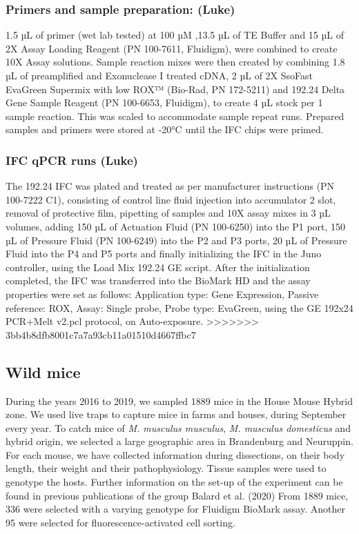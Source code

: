 \documentclass[
]{article}
\begin{document}
\hypertarget{primers-and-sample-preparation-luke}{%
\subsubsection{Primers and sample preparation:
(Luke)}\label{primers-and-sample-preparation-luke}}

1.5 µL of primer (wet lab tested) at 100 µM ,13.5 µL of TE Buffer and 15
µL of 2X Assay Loading Reagent (PN 100-7611, Fluidigm), were combined to
create 10X Assay solutions. Sample reaction mixes were then created by
combining 1.8 µL of preamplified and Exonuclease I treated cDNA, 2 µL of
2X SsoFast EvaGreen Supermix with low ROX™ (Bio-Rad, PN 172-5211) and
192.24 Delta Gene Sample Reagent (PN 100-6653, Fluidigm), to create 4 µL
stock per 1 sample reaction. This was scaled to accommodate sample
repeat runs. Prepared samples and primers were stored at -20°C until the
IFC chips were primed.

\hypertarget{ifc-qpcr-runs-luke}{%
\subsubsection{IFC qPCR runs (Luke)}\label{ifc-qpcr-runs-luke}}

The 192.24 IFC was plated and treated as per manufacturer instructions
(PN 100-7222 C1), consisting of control line fluid injection into
accumulator 2 slot, removal of protective film, pipetting of samples and
10X assay mixes in 3 µL volumes, adding 150 µL of Actuation Fluid (PN
100-6250) into the P1 port, 150 µL of Pressure Fluid (PN 100-6249) into
the P2 and P3 ports, 20 µL of Pressure Fluid into the P4 and P5 ports
and finally initializing the IFC in the Juno controller, using the Load
Mix 192.24 GE script. After the initialization completed, the IFC was
transferred into the BioMark HD and the assay properties were set as
follows: Application type: Gene Expression, Passive reference: ROX,
Assay: Single probe, Probe type: EvaGreen, using the GE 192x24 PCR+Melt
v2.pcl protocol, on Auto-exposure.
>>>>>>> 3bb4b8dfb8001c7a7a93cb11a01510d4667ffbc7

\hypertarget{wild-mice}{%
\subsection{Wild mice}\label{wild-mice}}

During the years 2016 to 2019, we sampled 1889 mice in the House Mouse
Hybrid zone. We used live traps to capture mice in farms and houses,
during September every year. To catch mice of \emph{M. musculus
musculus}, \emph{M. musculus domesticus} and hybrid origin, we selected
a large geographic area in Brandenburg and Neuruppin. For each mouse, we
have collected information during dissections, on their body length,
their weight and their pathophysiology. Tissue samples were used to
genotype the hosts. Further information on the set-up of the experiment
can be found in previous publications of the group Balard et al. (2020)
From 1889 mice, 336 were selected with a varying genotype for Fluidigm
BioMark assay. Another 95 were selected for fluorescence-activated cell
sorting.
\end{document}
